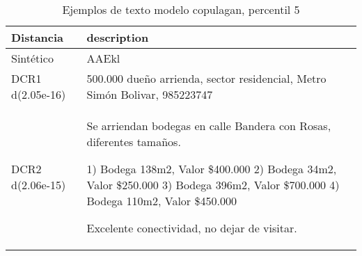 \begin{table}[H]
\centering
\fontsize{10}{14}\selectfont
\caption{Ejemplos de texto modelo copulagan, percentil 5}
\label{table-example-economicos-b-1-copulagan-5p-text}
\begin{tabular}{|l|m{35em}|}
\hline
\rowcolor[gray]{0.8}
Distancia & description \\
\hline Sintético & AAEkl \\
\hline DCR1 d(2.05e-16) & 500.000  due\~no arrienda, sector residencial, Metro Sim\'on Bolivar, 985223747 \\
\hline DCR2 d(2.06e-15) & Se arriendan bodegas en calle Bandera con Rosas, diferentes tama\~nos.

1) Bodega 138m2, Valor \$400.000
2) Bodega 34m2, Valor \$250.000
3) Bodega 396m2, Valor \$700.000
4) Bodega 110m2, Valor \$450.000

Excelente conectividad, no dejar de visitar. \\
\hline
\end{tabular}
\end{table}
